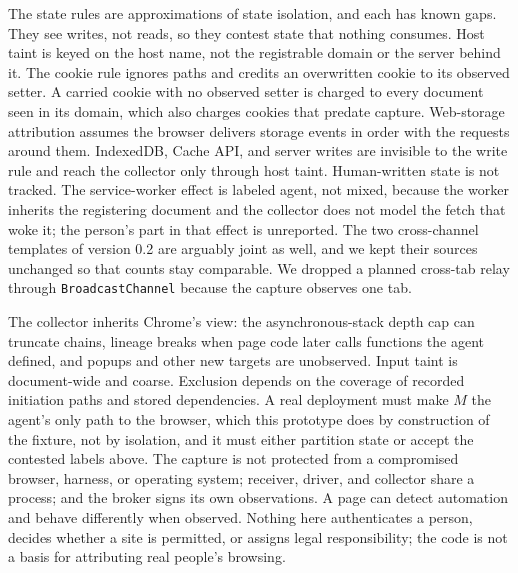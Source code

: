 \documentclass[11pt]{article}
\theoremstyle{definition}
\begin{document}
The state rules are approximations of state isolation, and each has known gaps.
They see writes, not reads, so they contest state that nothing consumes. Host
taint is keyed on the host name, not the registrable domain or the server behind
it. The cookie rule ignores paths and credits an overwritten cookie to its
observed setter. A carried cookie with no observed setter is charged to every
document seen in its domain, which also charges cookies that predate capture.
Web-storage attribution assumes the browser delivers storage events in order
with the requests around them. IndexedDB, Cache API, and server writes are
invisible to the write rule and reach the collector only through host taint.
Human-written state is not tracked. The service-worker effect is labeled agent,
not mixed, because the worker inherits the registering document and the
collector does not model the fetch that woke it; the person's part in that effect
is unreported. The two cross-channel templates of version 0.2 are arguably joint
as well, and we kept their sources unchanged so that counts stay comparable. We
dropped a planned cross-tab relay through \texttt{BroadcastChannel} because the
capture observes one tab.

The collector inherits Chrome's view: the asynchronous-stack depth cap can
truncate chains, lineage breaks when page code later calls functions the agent
defined, and popups and other new targets are unobserved. Input taint is
document-wide and coarse. Exclusion depends on the coverage of recorded initiation paths and stored dependencies. A
real deployment must make $M$ the agent's only path to the browser, which this
prototype does by construction of the fixture, not by isolation, and it must
either partition state or accept the contested labels above. The capture is not
protected from a compromised browser, harness, or operating system; receiver,
driver, and collector share a process; and the broker signs its own
observations. A page can detect automation \cite{visiblev8} and behave
differently when observed. Nothing here authenticates a person, decides whether a
site is permitted, or assigns legal responsibility; the code is not a basis for
attributing real people's browsing.
\end{document}
